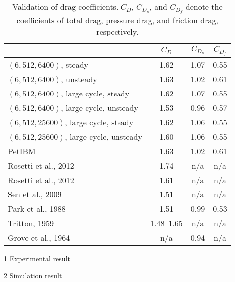 \begin{table}[hbt!]
    \singlespacing
    \begin{threeparttable}[b]
        \begin{tabular}{lccc}
            \toprule
            & $C_D$ & $C_{D_p}$ & $C_{D_f}$ \\
            \midrule
            $(6, 512, 6400)$, steady & 1.62 & 1.07 & 0.55 \\
            $(6, 512, 6400)$, unsteady & 1.63 & 1.02 & 0.61 \\
            $(6, 512, 6400)$, large cycle, steady & 1.62 & 1.07 & 0.55 \\
            $(6, 512, 6400)$, large cycle, unsteady & 1.53 & 0.96 & 0.57 \\
            $(6, 512, 25600)$, large cycle, steady & 1.62 & 1.06 & 0.55 \\
            $(6, 512, 25600)$, large cycle, unsteady & 1.60 & 1.06 & 0.55 \\
            PetIBM & 1.63 & 1.02 & 0.61 \\
            Rosetti et al., 2012\cite{rosetti_urans_2012}\tnote{1} & 1.74\pm 0.09 & n/a & n/a \\
            Rosetti et al., 2012\cite{rosetti_urans_2012}\tnote{2} & 1.61 & n/a & n/a \\
            Sen et al., 2009\cite{sen_steady_2009}\tnote{2} & 1.51 & n/a & n/a \\
            Park et al., 1988\cite{park_numerical_1998}\tnote{2} & 1.51 & 0.99 & 0.53 \\
            Tritton, 1959\cite{tritton_experiments_1959}\tnote{1} & 1.48--1.65 & n/a & n/a \\
            Grove et al., 1964\cite{grove_experimental_1964}\tnote{1} & n/a & 0.94 & n/a \\
            \bottomrule
        \end{tabular}%
        \begin{tablenotes}
            \footnotesize
            \item [1] Experimental result
            \item [2] Simulation result
        \end{tablenotes}
        \caption[PINNs, 2D Cylinder, $Re=40$: validation of drag coefficients]{%
            Validation of drag coefficients.%
            $C_D$, $C_{D_p}$, and $C_{D_f}$ denote the coefficients of total drag, pressure drag, %
            and friction drag, respectively.%
        }%
        \label{table:cylinder-2d-re40-comparison-cd}
    \end{threeparttable}
\end{table}%
